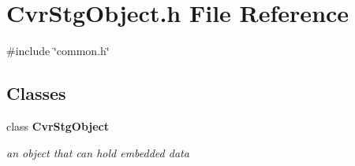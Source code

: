 \section{Cvr\+Stg\+Object.\+h File Reference}
\label{CvrStgObject_8h}
{\ttfamily \#include \char`\"{}common.\+h\char`\"{}}\newline
\subsection*{Classes}
\begin{DoxyCompactItemize}
\item 
class \textbf{ Cvr\+Stg\+Object}
\begin{DoxyCompactList}\small\item\em an object that can hold embedded data \end{DoxyCompactList}\end{DoxyCompactItemize}
